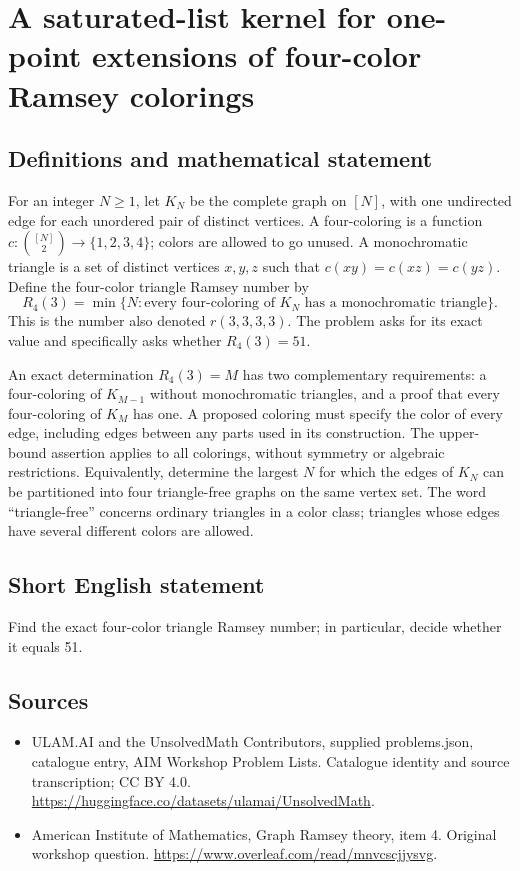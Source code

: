 \documentclass[11pt,a4paper]{article}
\begin{document}
\section*{A saturated-list kernel for one-point extensions of four-color Ramsey colorings}\label{statement}

\subsection{Definitions and mathematical statement}
For an integer $N\ge1$, let $K_N$ be the complete graph on $[N]$,
with one undirected edge for each unordered pair of distinct vertices.
A four-coloring is a function
$c:\binom{[N]}2\to\{1,2,3,4\}$; colors are allowed to go unused.
A monochromatic triangle is a set of distinct vertices $x,y,z$ such
that $c(xy)=c(xz)=c(yz)$.
Define the four-color triangle Ramsey number by
\[
 R_4(3)=\min\{N:\text{every four-coloring of }K_N
                           \text{ has a monochromatic triangle}\}.
\]
This is the number also denoted $r(3,3,3,3)$.
The problem asks for its exact value and specifically asks whether
$R_4(3)=51$.

An exact determination $R_4(3)=M$ has two complementary requirements:
a four-coloring of $K_{M-1}$ without monochromatic triangles, and a
proof that every four-coloring of $K_M$ has one. A proposed coloring
must specify the color of every edge, including edges between any
parts used in its construction. The upper-bound assertion applies to
all colorings, without symmetry or algebraic restrictions.
Equivalently, determine the largest $N$ for which the edges of $K_N$
can be partitioned into four triangle-free graphs on the same vertex
set. The word ``triangle-free'' concerns ordinary triangles in a color
class; triangles whose edges have several different colors are allowed.
\subsection{Short English statement}
Find the exact four-color triangle Ramsey number; in particular, decide whether it equals 51.
\subsection{Sources}
\begin{itemize}
\item[S1] ULAM.AI and the UnsolvedMath Contributors, supplied problems.json, catalogue entry, AIM Workshop Problem Lists. Catalogue identity and source transcription; CC BY 4.0.
\url{https://huggingface.co/datasets/ulamai/UnsolvedMath}.
\item[S2] American Institute of Mathematics, Graph Ramsey theory, item 4. Original workshop question.
\url{https://www.overleaf.com/read/mnvcscjjysvg}.
\end{itemize}
\end{document}
